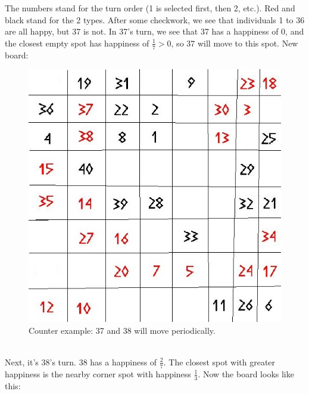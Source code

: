 \documentclass{article}
\begin{document}
The numbers stand for the turn order (1 is selected first, then 2, etc.). Red and black stand for the 2 types. After some checkwork, we see that individuals 1 to 36 are all happy, but 37 is not. In 37's turn, we see that 37 has a happiness of $0$, and the closest empty spot has happiness of $\frac{1}{7} > 0$, so 37 will move to this spot. New board:
\begin{figure}[!ht]
\begin{center}
\includegraphics[scale=0.25]{segregation_tegenvb_1.jpg}
\end{center}
\caption{Counter example: 37 and 38 will move periodically.}\label{counterexample1}
\end{figure}
\\Next, it's 38's turn. 38 has a happiness of $\frac{2}{7}$. The closest spot with greater happiness is the nearby corner spot with happiness $\frac{1}{3}$. Now the board looks like this:
\end{document}
